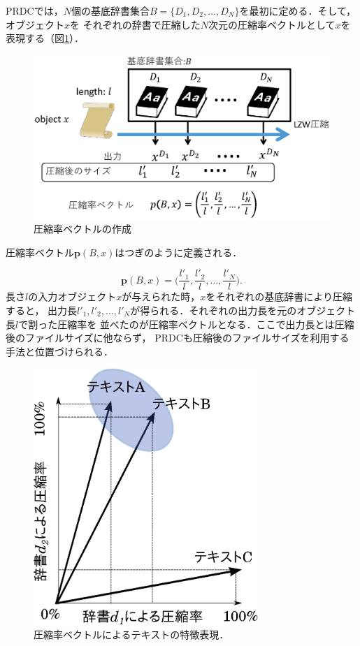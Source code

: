PRDCでは，$N$個の基底辞書集合$B=\{D_1,D_2,\dots,D_N\}$を最初に定める．そして，オブジェクト$x$を
それぞれの辞書で圧縮した$N$次元の圧縮率ベクトルとして$x$を表現する（図\ref{fig:PRDC.eps}）．
\begin{figure}[tb]
\centering
\includegraphics[clip, width=\columnwidth]{image/PRDC.eps}
\caption{圧縮率ベクトルの作成}
\label{fig:PRDC.eps}
\end{figure}

圧縮率ベクトル$\boldsymbol{p}(B,x)$はつぎのように定義される．

\begin{equation}
\boldsymbol{p}(B,x) = \biggl(\frac{l'_1}{l}, \frac{l'_2}{l},\dots,\frac{l'_N}{l} \biggr).
\label{eq:PRDC}
\end{equation}
長さ$l$の入力オブジェクト$x$が与えられた時，$x$をそれぞれの基底辞書により圧縮すると，
出力長$l'_1,l'_2,\dots,l'_N$が得られる．それぞれの出力長を元のオブジェクト長$l$で割った圧縮率を
並べたのが圧縮率ベクトルとなる．ここで出力長とは圧縮後のファイルサイズに他ならず，
PRDCも圧縮後のファイルサイズを利用する手法と位置づけられる．

\begin{figure}[tb]
\begin{center}
\includegraphics[width=8.5cm]{image/cv.eps}
\end{center}
\caption{圧縮率ベクトルによるテキストの特徴表現．}
\label{cv}
\end{figure}

